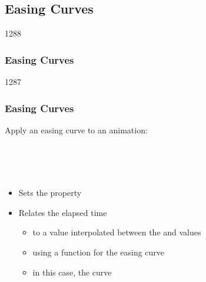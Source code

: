%
%
%
%

\subsection{Easing Curves}


\begin{slide}{1288}\frametitle{Easing Curves}



\end{slide}


\begin{slide}{1287}\frametitle{Easing Curves}

Apply an easing curve to an animation:

\vspace*{0.5em}
\begin{qml}
\\
\\
\\
\qtt{\}}
\end{qml}

\begin{itemize}
\item Sets the  property
\item Relates the elapsed time
  \begin{itemize}
  \item to a value interpolated between the  and 
        values
  \item using a function for the easing curve
  \item in this case, the  curve
  \end{itemize}
\end{itemize}

\end{slide}

